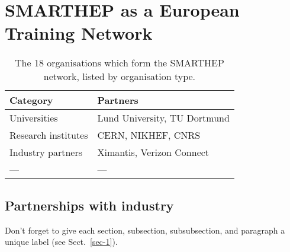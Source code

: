 \section{SMARTHEP as a European Training Network}
\label{network}

\begin{table}
    \centering
    \caption{The 18 organisations which form the SMARTHEP network, listed by organisation type.}
    \label{partners}       
    \begin{tabular}{ll}
    \hline
    Category & Partners \\\hline
    Universities        & Lund University, TU Dortmund \\
    Research institutes & CERN, NIKHEF, CNRS \\
    Industry partners   & Ximantis, Verizon Connect \\
    --- & --- \\\hline
    \end{tabular}
\end{table}


\subsection{Partnerships with industry}
\label{sec-2}
Don't forget to give each section, subsection, subsubsection, and
paragraph a unique label (see Sect.~\ref{sec-1}).
